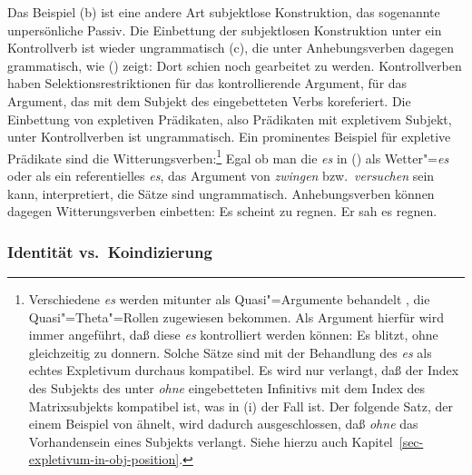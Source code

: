 \noindent
Das Beispiel (b) ist eine andere Art subjektlose Konstruktion, das sogenannte unpersönliche Passiv.
\eal
{}
\zl
Die Einbettung der subjektlosen Konstruktion unter ein Kontrollverb ist wieder ungrammatisch (c), die
unter Anhebungsverben dagegen grammatisch, wie () zeigt:
\ea
Dort schien noch gearbeitet zu werden.
\z
Kontrollverben haben Selektionsrestriktionen für das kontrollierende Argument, \dash für das Argument,
das mit dem Subjekt des eingebetteten Verbs koreferiert. Die Einbettung von expletiven Prädikaten,
also Prädikaten mit expletivem Subjekt, unter Kontrollverben ist ungrammatisch. Ein prominentes
Beispiel für expletive Prädikate sind die Witterungsverben:\footnote{
        Verschiedene \emph{es} werden mitunter als Quasi"=Argumente behandelt \citep[]{Chomsky93a},
        die Quasi"=Theta"=Rollen zugewiesen bekommen.
        Als Argument hierfür wird immer angeführt, daß diese \emph{es} kontrolliert werden können:
        \ea
        Es blitzt, ohne gleichzeitig zu donnern.
        \z
        Solche Sätze sind mit der Behandlung des \emph{es} als echtes Expletivum durchaus
        kompatibel. Es wird nur verlangt, daß der Index des Subjekts des unter \emph{ohne} eingebetteten
        Infinitivs mit dem Index des Matrixsubjekts kompatibel ist, was in (i) der Fall ist.
        Der folgende Satz, der einem Beispiel von \citet[]{Fanselow91a} ähnelt,
        wird dadurch ausgeschlossen, daß \emph{ohne} das Vorhandensein eines Subjekts
        verlangt.
        \z
        Siehe hierzu auch Kapitel~\ref{sec-expletivum-in-obj-position}.%
}
\eal
{}
\zl
Egal ob man die \emph{es} in () als Wetter"=\emph{es} oder als ein referentielles \emph{es}, das
Argument von \emph{zwingen} bzw.\ \emph{versuchen} sein kann, interpretiert, die Sätze sind ungrammatisch.
Anhebungsverben können dagegen Witterungsverben einbetten:
\eal
\ex Es scheint zu regnen.
\ex Er sah es regnen.
\zl


\subsubsection{Identität vs.\ Koindizierung}
\label{sec-rais-contr-identity-coindexing}

